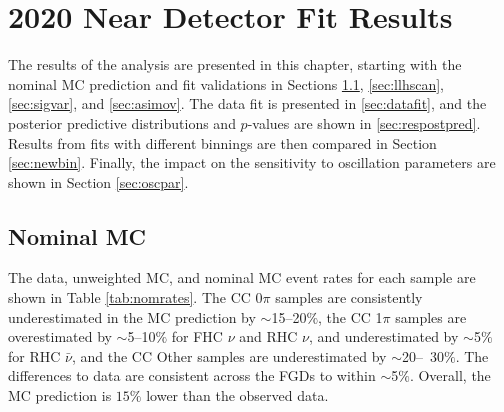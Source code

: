 \chapter{2020 Near Detector Fit Results}\label{sec:2020Fit}

The results of the analysis are presented in this chapter, starting with the nominal MC prediction and fit validations in Sections \ref{sec:nommc}, \ref{sec:llhscan}, \ref{sec:sigvar}, and \ref{sec:asimov}. The data fit is presented in \ref{sec:datafit}, and the posterior predictive distributions and $p$-values are shown in \ref{sec:respostpred}. Results from fits with different binnings are then compared in Section \ref{sec:newbin}. Finally, the impact on the sensitivity to oscillation parameters are shown in Section \ref{sec:oscpar}.

\section{Nominal MC}\label{sec:nommc}

The data, unweighted MC, and nominal MC event rates for each sample are shown in Table \ref{tab:nomrates}. The CC 0$\pi$ samples are consistently underestimated in the MC prediction by $\sim$15--20$\%$, the CC 1$\pi$ samples are overestimated by $\sim$5--10$\%$ for FHC $\nu$ and RHC $\nu$, and underestimated by $\sim$5$\%$ for RHC $\bar{\nu}$, and the CC Other samples are underestimated by $\sim$20--~30$\%$. The differences to data are consistent across the FGDs to within $\sim$5$\%$. Overall, the MC prediction is $15\%$ lower than the observed data.

